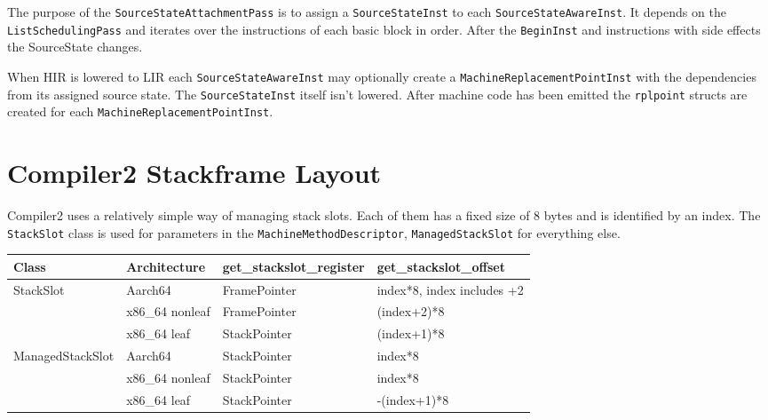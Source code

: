 \documentclass[draft,final]{vutinfth} %
\begin{document}
    The purpose of the \lstinline{SourceStateAttachmentPass} is to assign a \lstinline{SourceStateInst} to each \lstinline{SourceStateAwareInst}.
    It depends on the \lstinline{ListSchedulingPass} and iterates over the instructions of each basic block in order.
    After the \lstinline{BeginInst} and instructions with side effects the SourceState changes.

    When HIR is lowered to LIR each \lstinline{SourceStateAwareInst}
    may optionally create a \lstinline{MachineReplacementPointInst} with the dependencies from its assigned source state.
    The \lstinline{SourceStateInst} itself isn't lowered.
    After machine code has been emitted the \lstinline{rplpoint} structs are created
    for each \lstinline{MachineReplacementPointInst}.


    \section{Compiler2 Stackframe Layout}\label{sec:compiler2-stackframe-layout}

    Compiler2 uses a relatively simple way of managing stack slots.
    Each of them has a fixed size of 8 bytes and is identified by an index.
    The \lstinline{StackSlot} class is used for parameters in the \lstinline{MachineMethodDescriptor},
    \lstinline{ManagedStackSlot} for everything else.

    \begin{tabular}{llll}
        \toprule
        Class            & Architecture    & get\_stackslot\_register & get\_stackslot\_offset     \\
        \midrule
        StackSlot        & Aarch64         & FramePointer             & index*8, index includes +2 \\
        & x86\_64 nonleaf & FramePointer             & (index+2)*8                \\
        & x86\_64 leaf    & StackPointer             & (index+1)*8                \\
        \midrule
        ManagedStackSlot & Aarch64         & StackPointer             & index*8                    \\
        & x86\_64 nonleaf & StackPointer             & index*8                    \\
        & x86\_64 leaf    & StackPointer             & -(index+1)*8               \\
        \bottomrule
    \end{tabular}
\end{document}
